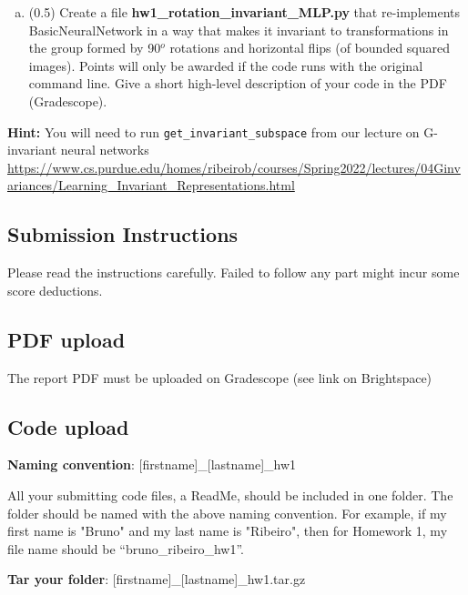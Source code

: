 \documentclass{article}
\newcommand{\homeworknumber}{1}
\begin{document}
\begin{enumerate}
\begin{enumerate}[(a)]
\item (0.5)  Create a file \textbf{hw\homeworknumber\_rotation\_invariant\_MLP.py} that re-implements BasicNeuralNetwork in a way that makes it invariant to transformations in the group formed by 90$^o$ rotations and horizontal flips (of bounded squared images). Points will only be awarded if the code runs with the original command line. Give a short high-level description of your code in the PDF (Gradescope).
 \end{enumerate}
  {\bf Hint:} You will need to run \verb|get_invariant_subspace| from our lecture on G-invariant neural networks\\
{\scriptsize  \url{https://www.cs.purdue.edu/homes/ribeirob/courses/Spring2022/lectures/04Ginvariances/Learning_Invariant_Representations.html}}
\end{enumerate}

\newpage
\subsection*{Submission Instructions}

Please read the instructions carefully. Failed to follow any part might incur some score deductions.

\hfill

\subsection*{\bf PDF upload}

The report PDF must be uploaded on Gradescope (see link on Brightspace)

\hfill


\subsection*{\bf Code upload}

\noindent \textbf{Naming convention}: [firstname]\_[lastname]\_hw\homeworknumber

All your submitting code files, a ReadMe, should be included in one folder. The folder should be named with the above naming convention. For example, if my first name is "Bruno" and my last name is "Ribeiro", then for Homework \homeworknumber, my file name should be ``bruno\_ribeiro\_hw\homeworknumber''.


\hfill

\noindent \textbf{Tar your folder}: [firstname]\_[lastname]\_hw\homeworknumber.tar.gz
\end{document}
